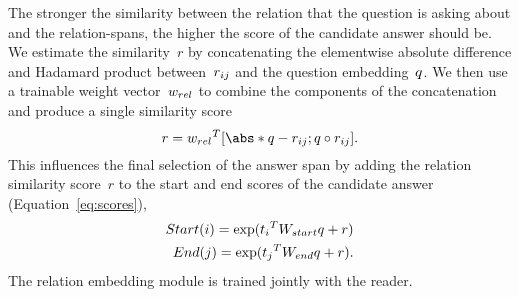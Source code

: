 The stronger the similarity between the relation that the question is
asking about and the relation-spans, the higher the score of the
candidate answer should be.  We estimate the similarity~$r$ by
concatenating the elementwise absolute difference and Hadamard product
between~$\*r_{ij}$ and the question embedding~$\*q$. We then use a
trainable weight vector~$\*{w_{rel}}$ to combine the components of the
concatenation and produce a single similarity score
\[
r = \*{w_{rel}}^T [\abs*{\*q-\*{r_{ij}}};\*{q} \circ \*{r_{ij}}].
\]
This influences the final selection of the answer span by adding the
relation similarity score~$r$ to the start and end scores of the
candidate answer (Equation~\ref{eq:scores}),
\begin{eqnarray}
Start(i) = \exp(\*{t_i}^TW_{start}\*q + r)\nonumber\\
End(j) = \exp(\*{t_j}^TW_{end}\*q + r).
\label{eq:scores_w_rel}
\end{eqnarray}
The relation embedding module is trained jointly with the reader.

